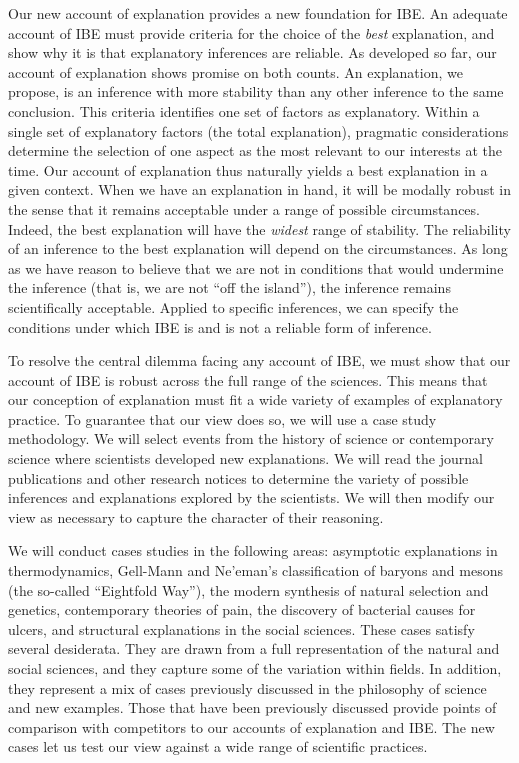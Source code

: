 \documentclass{article}[11pt]
\begin{document}
Our new account of explanation provides a new foundation for IBE.  An adequate account of IBE must provide criteria for the choice of the \textit{best} explanation, and show why it is that explanatory inferences are reliable.  As developed so far, our account of explanation shows promise on both counts.  An explanation, we propose, is an inference with more stability than any other inference to the same conclusion.  This criteria identifies one set of factors as explanatory.  Within a single set of explanatory factors (the total explanation), pragmatic considerations determine the selection of one aspect as the most relevant to our interests at the time.  Our account of explanation thus naturally yields a best explanation in a given context.  When we have an explanation in hand, it will be modally robust in the sense that it remains acceptable under a range of possible circumstances.  Indeed, the best explanation will have the \textit{widest} range of stability.  The reliability of an inference to the best explanation will depend on the circumstances.  As long as we have reason to believe that we are not in conditions that would undermine the inference (that is, we are not ``off the island''), the inference remains scientifically acceptable.  Applied to specific inferences, we can specify the conditions under which IBE is and is not a reliable form of inference.


To resolve the central dilemma facing any account of IBE, we must show that our account of IBE is robust across the full range of the sciences.  This means that our conception of explanation must fit a wide variety of examples of explanatory practice.  To guarantee that our view does so, we will use a case study methodology. We will select events from the history of science or contemporary science where scientists developed new explanations.  We will read the journal publications and other research notices to determine the variety of possible inferences and explanations explored by the scientists.   We will then modify our view as necessary to capture the character of their reasoning.  


We will conduct cases studies in the following areas: asymptotic explanations in thermodynamics, Gell-Mann and Ne'eman's classification of baryons and mesons (the so-called ``Eightfold Way''), the modern synthesis of natural selection and genetics, contemporary theories of pain, the discovery of bacterial causes for ulcers, and structural explanations in the social sciences.  These cases satisfy several desiderata. They are drawn from a full representation of the natural and social sciences, and they capture some of the variation within fields.  In addition, they represent a mix of cases previously discussed in the philosophy of science and new examples. Those that have been previously discussed provide points of comparison with competitors to our accounts of explanation and IBE.  The new cases let us test our view against a wide range of scientific practices.  
\end{document}
